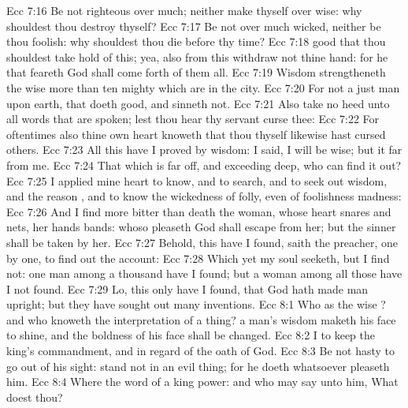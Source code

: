 \vs Ecc 7:16 Be not righteous over much; neither make thyself over wise: why shouldest thou destroy thyself?
\vs Ecc 7:17 Be not over much wicked, neither be thou foolish: why shouldest thou die before thy time?
\vs Ecc 7:18  good that thou shouldest take hold of this; yea, also from this withdraw not thine hand: for he that feareth God shall come forth of them all.
\vs Ecc 7:19 Wisdom strengtheneth the wise more than ten mighty  which are in the city.
\vs Ecc 7:20 For  not a just man upon earth, that doeth good, and sinneth not.
\vs Ecc 7:21 Also take no heed unto all words that are spoken; lest thou hear thy servant curse thee:
\vs Ecc 7:22 For oftentimes also thine own heart knoweth that thou thyself likewise hast cursed others.
\vs Ecc 7:23 All this have I proved by wisdom: I said, I will be wise; but it  far from me.
\vs Ecc 7:24 That which is far off, and exceeding deep, who can find it out?
\vs Ecc 7:25 I applied mine heart to know, and to search, and to seek out wisdom, and the reason , and to know the wickedness of folly, even of foolishness  madness:
\vs Ecc 7:26 And I find more bitter than death the woman, whose heart  snares and nets,  her hands  bands: whoso pleaseth God shall escape from her; but the sinner shall be taken by her.
\vs Ecc 7:27 Behold, this have I found, saith the preacher,  one by one, to find out the account:
\vs Ecc 7:28 Which yet my soul seeketh, but I find not: one man among a thousand have I found; but a woman among all those have I not found.
\vs Ecc 7:29 Lo, this only have I found, that God hath made man upright; but they have sought out many inventions.
\vs Ecc 8:1 Who  as the wise ? and who knoweth the interpretation of a thing? a man's wisdom maketh his face to shine, and the boldness of his face shall be changed.
\vs Ecc 8:2 I  to keep the king's commandment, and  in regard of the oath of God.
\vs Ecc 8:3 Be not hasty to go out of his sight: stand not in an evil thing; for he doeth whatsoever pleaseth him.
\vs Ecc 8:4 Where the word of a king  power: and who may say unto him, What doest thou?
